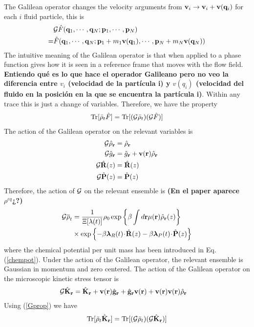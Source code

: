\documentclass[b5paper,openright,11pt]{book}
\newcommand{\esc}{\!\cdot\!}
\newcommand{\Note}[1]{{\bf \color{red}#1}}    %
\newcommand{\Pendiente}[1]{{\color{green}#1}} %
\begin{document}
The Galilean operator changes the velocity arguments from ${\bf v}_i\to {\bf v}_i+{\bf v}({\bf q}_i)$ for each $i$ fluid particle, this is
\begin{align}
&  {\cal G}\hat{F}({\bf q}_1,\cdots,{\bf q}_N;{\bf p}_1,\cdots,{\bf p}_N)
\nonumber\\
=&\hat{F}({\bf q}_1,\cdots,{\bf q}_N;{\bf p}_1+m_1{\bf v}({\bf q}_1),\cdots,{\bf p}_N+m_N{\bf v}({\bf q}_N))
\end{align}
The intuitive meaning of the Galilean operator is that when applied to a phase function gives how it is seen in a reference frame that moves with the flow field. \Note{Entiendo qué es lo que hace el operador Galileano pero no veo la diferencia entre $v_i$ (velocidad de la partícula i) y $v(q_i)$ (velocidad del fluido en la posición en la que se encuentra la partícula i)}. Within any trace this is just a change of variables. Therefore, we have the property
\begin{align}
  {\rm Tr}[\bar{\rho}_t\hat{F}] &= {\rm Tr}[({\cal G}\bar{\rho}_t)({\cal G}\hat{F})] \nonumber \\
  \label{Gprop}
\end{align}
The action of the Galilean operator on the relevant variables is
\begin{align}
  {\cal G}\hat{\rho}_{\bf r} &= \hat{\rho}_{\bf r} \nonumber\\
  {\cal G}\hat{g}_{\bf r} &= \hat{g}_{\bf r} + {\bf v}({\bf r})\hat{\rho}_{\bf r} \nonumber \\
  {\cal G}\hat{\bf R}(z) &= \hat{\bf R}(z) \nonumber\\
  {\cal G}\hat{\bf P}(z) &= \hat{\bf P}(z)
\end{align}
Therefore, the action of ${\cal G}$ on the relevant ensemble is \Note{(En el paper aparece $\rho^{eq}$¿?)}
\begin{align}
  {\cal G}\overline{\rho}_t &=
\frac{1}{\Xi[\lambda(t)]}\rho_0
\exp\left\{\beta\int d{\bf r}\mu({\bf r})\hat{\rho}_{\bf r}(z)\right\}
\nonumber\\
&\times
\exp\left\{-\beta \boldsymbol{\lambda}_{R}(t)\esc\hat{\bf R}(z)
-\beta \boldsymbol{\lambda}_{P}(t)\esc\hat{\bf P}(z)\right\}
\label{resrelens}
\end{align}
where  the chemical  potential per  unit mass  has been  introduced in
Eq.  (\ref{chempot}). \Pendiente{Under the action of the Galilean operator, the relevant ensemble is Gaussian in momentum and zero centered.}  
The  action  of the  Galilean  operator on  the
microscopic kinetic stress tensor is
\begin{align}
  {\cal G}\hat{{\bf K}}_{\bf r} &=
\hat{{\bf K}}_{\bf r} 
+{\bf v}({\bf r})\hat{\bf g}_{\bf r}
+\hat{\bf g}_{\bf r}{\bf v}({\bf r})
+{\bf v}({\bf r}){\bf v}({\bf r})\hat{\rho}_{\bf r}
\end{align}
Using (\ref{Gprop}) we have
\begin{align}
  {\rm Tr}[\bar{\rho}_t\hat{{\bf K}}_{\bf r}]={\rm Tr}[({\cal G}\bar{\rho}_t)({\cal G}\hat{{\bf K}}_{\bf r})]
\end{align}
\end{document}

